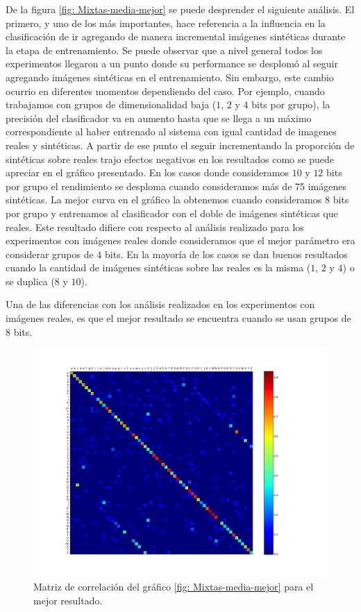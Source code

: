 	De la figura \ref{fig: Mixtas-media-mejor} se puede desprender el siguiente análisis. El primero, y uno de los más importantes, hace referencia a la influencia en la clasificación de ir agregando de manera incremental imágenes sintéticas durante la etapa de entrenamiento. Se puede observar que a nivel general todos los experimentos llegaron a un punto donde su performance se desplomó al seguir agregando imágenes sintéticas en el entrenamiento. Sin embargo, este cambio ocurrio en diferentes momentos dependiendo del caso. Por ejemplo, cuando trabajamos con grupos de dimensionalidad baja ($1$, $2$ y $4$ bits por grupo), la precisión del clasificador va en aumento hasta que se llega a un máximo correspondiente al haber entrenado al sistema con igual cantidad de imagenes reales y sintéticas. A partir de ese punto el seguir incrementando la proporción de sintéticas sobre reales trajo efectos negativos en los resultados como se puede apreciar en el gráfico presentado. En los casos donde consideramos $10$ y $12$ bits por grupo el rendimiento se desploma cuando consideramos más de 75 imágenes sintéticas. La mejor curva en el gráfico la obtenemos cuando consideramos $8$ bits por grupo y entrenamos al clasificador con el doble de imágenes sintéticas que reales. Este resultado difiere con respecto al análisis realizado para los experimentos con imágenes reales donde consideramos que el mejor parámetro era considerar grupos de $4$ bits. En la mayoría de los casos se dan buenos resultados cuando la cantidad de imágenes sintéticas sobre las reales es la misma ($1$, $2$ y $4$) o se duplica ($8$ y $10$).
	
	Una de las diferencias con los análisis realizados en los experimentos con imágenes reales, es que el mejor resultado se encuentra cuando se usan grupos de $8$ bits. 


			\begin{figure}[!htbp]
				\centerline{\includegraphics[scale=0.4]{img/resultados/mixtas/best_mean_matrix_Alpha0,01_4080-8.png}}
				\caption[Mixtas Matriz expon]{Matriz de correlación del gráfico \ref{fig: Mixtas-media-mejor} para el mejor resultado. }
				\label{fig: Mixtas-Matrix-media-mejor}
			\end{figure}
	
